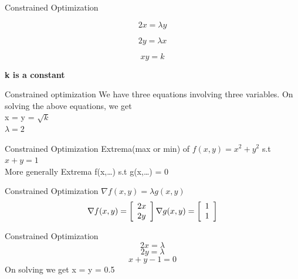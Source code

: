 \documentclass{beamer}
\begin{document}
\begin{frame}{Constrained Optimization}

\begin{equation}
2x = \lambda y
\end{equation}


\begin{equation}
2y = \lambda x
\end{equation}


\begin{equation}
xy = k
\end{equation}

\textbf{k is a constant}
\end{frame}

\begin{frame}{Constrained optimization}
We have three equations involving three variables. 
On solving the above equations, we get\\
x = y = $\sqrt{k}$\\
$\lambda = 2$\\
\end{frame}

\begin{frame}{Constrained Optimization}
Extrema(max or min) of $f(x,y) = x^{2} + y^{2}$ s.t $x + y = 1$\\

\vspace{5em}
More generally Extrema f(x,\dots) s.t g(x,\dots) = 0
\end{frame}

\begin{frame}{Constrained Optimization}
$\nabla f(x,y) = \lambda g(x,y)$ \\
\vspace{1em}
$$
\nabla f(x, y)=\left[\begin{array}{l}
{2 x} \\
{2 y}
\end{array}\right] 
\vspace{1em} 
\nabla g(x, y)=\left[\begin{array}{l}
{1} \\
{1}
\end{array}\right]
$$
\end{frame}

\begin{frame}{Constrained Optimization}
\begin{equation}
2x=\lambda
\end{equation}
\begin{equation}
2y=\lambda
\end{equation}
\begin{equation}
x + y - 1 = 0
\end{equation}
On solving we get x = y = 0.5
\end{frame}
\end{document}

